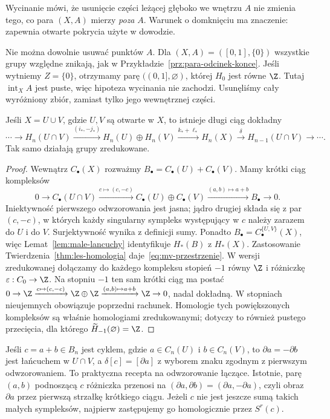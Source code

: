 Wycinanie mówi, że usunięcie części
leżącej głęboko we wnętrzu $A$
nie zmienia tego, co para $(X,A)$
mierzy \emph{poza} $A$. Warunek
o domknięciu ma znaczenie:
zapewnia otwarte pokrycia użyte
w dowodzie.

Nie można dowolnie usuwać punktów $A$. Dla
$(X,A)=([0,1],\{0\})$ wszystkie grupy względne znikają,
jak w Przykładzie~\ref{prz:para-odcinek-konce}.
Jeśli wytniemy $Z=\{0\}$, otrzymamy parę $((0,1],\varnothing)$,
której $H_0$ jest równe $\Z$. Tutaj $\operatorname{int}_X A$
jest puste, więc hipoteza wycinania nie zachodzi.
Usunęliśmy cały wyróżniony zbiór, zamiast tylko jego wewnętrznej części.

\begin{twierdzenie}
\label{thm:mv-przestrzenie}
Jeśli $X=U\cup V$, gdzie $U,V$
są otwarte w $X$, to istnieje
długi ciąg dokładny
\begin{equation}\label{eq:mv-przestrzenie}
 \cdots\to H_n(U\cap V)
 \xrightarrow{(i_*,-j_*)}
 H_n(U)\oplus H_n(V)
 \xrightarrow{k_*+\ell_*}H_n(X)
 \xrightarrow{\delta}H_{n-1}(U\cap V)\to\cdots.
\end{equation}
Tak samo działają grupy zredukowane.
\end{twierdzenie}
\begin{proof}
Wewnątrz $C_\bullet(X)$ rozważmy
$B_\bullet=C_\bullet(U)+C_\bullet(V)$.
Mamy krótki ciąg kompleksów
\[
 0\to C_\bullet(U\cap V)
 \xrightarrow{c\mapsto(c,-c)}
 C_\bullet(U)\oplus C_\bullet(V)
 \xrightarrow{(a,b)\mapsto a+b}
 B_\bullet\to0.
\]
Iniektywność pierwszego odwzorowania jest jasna;
jądro drugiej składa się z par
$(c,-c)$, w których każdy singularny
sympleks występujący w $c$ należy
zarazem do $U$ i do $V$.
Surjektywność wynika z definicji sumy.
Ponadto $B_\bullet=C_\bullet^{\{U,V\}}(X)$,
więc Lemat~\ref{lem:male-lancuchy}
identyfikuje $H_*(B)$ z $H_*(X)$.
Zastosowanie Twierdzenia~\ref{thm:les-homologia}
daje~\eqref{eq:mv-przestrzenie}.
W wersji zredukowanej dołączamy
do każdego kompleksu stopień $-1$
równy $\Z$ i różniczkę
$\varepsilon:C_0\to\Z$.
Na stopniu $-1$ ten sam krótki
ciąg ma postać
$0\to\Z\xrightarrow{c\mapsto(c,-c)}
\Z\oplus\Z\xrightarrow{(a,b)\mapsto a+b}
\Z\to0$, nadal dokładną.
W stopniach nieujemnych
obowiązuje poprzedni rachunek.
Homologie tych powiększonych
kompleksów są właśnie
homologiami zredukowanymi;
dotyczy to również pustego
przecięcia, dla którego
$\widetilde H_{-1}(\varnothing)=\Z$.
\end{proof}

Jeśli $c=a+b\in B_n$ jest cyklem,
gdzie $a\in C_n(U)$ i $b\in C_n(V)$,
to $\partial a=-\partial b$ jest
łańcuchem w $U\cap V$, a
$\delta[c]=[\partial a]$ z wyborem
znaku zgodnym z pierwszym odwzorowaniem.
To praktyczna recepta na odwzorowanie łączące.
Istotnie, parę $(a,b)$ podnoszącą $c$ różniczka przenosi
na $(\partial a,\partial b)=(\partial a,-\partial a)$,
czyli obraz $\partial a$ przez pierwszą strzałkę krótkiego ciągu.
Jeżeli $c$ nie jest jeszcze sumą takich małych sympleksów,
najpierw zastępujemy go homologicznie przez $S^r(c)$.

